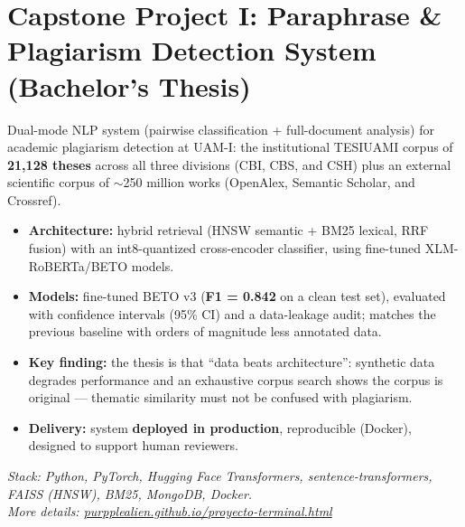 \documentclass[10pt,letterpaper]{article}
\begin{document}
\newpage
\section*{Capstone Project I: Paraphrase \& Plagiarism Detection System (Bachelor's Thesis)}
\justifying
\small
Dual-mode NLP system (pairwise classification + full-document analysis) for academic plagiarism detection at UAM-I: the institutional TESIUAMI corpus of \textbf{21{,}128 theses} across all three divisions (CBI, CBS, and CSH) plus an external scientific corpus of $\sim$250 million works (OpenAlex, Semantic Scholar, and Crossref).
\vspace{0.12cm}
\begin{itemize}
    \item \textbf{Architecture:} hybrid retrieval (HNSW semantic + BM25 lexical, RRF fusion) with an int8-quantized cross-encoder classifier, using fine-tuned XLM-RoBERTa/BETO models.
    \item \textbf{Models:} fine-tuned BETO v3 (\textbf{F1 = 0.842} on a clean test set), evaluated with confidence intervals (95\% CI) and a data-leakage audit; matches the previous baseline with orders of magnitude less annotated data.
    \item \textbf{Key finding:} the thesis is that ``data beats architecture'': synthetic data degrades performance and an exhaustive corpus search shows the corpus is original — thematic similarity must not be confused with plagiarism.
    \item \textbf{Delivery:} system \textbf{deployed in production}, reproducible (Docker), designed to support human reviewers.
\end{itemize}
\vspace{0.1cm}
{\small\itshape\color{textsec} Stack: Python, PyTorch, Hugging Face Transformers, sentence-transformers, FAISS (HNSW), BM25, MongoDB, Docker.\\ More details: \href{https://purpplealien.github.io/proyecto-terminal.html}{purpplealien.github.io/proyecto-terminal.html}}

\vspace{0.5cm}

\end{document}
